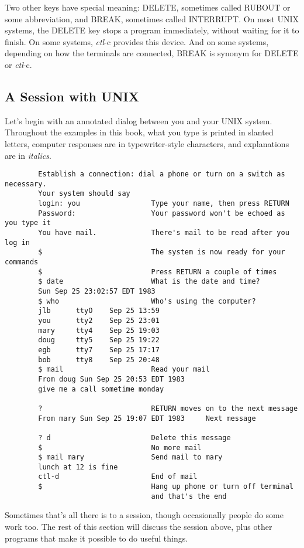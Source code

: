 Two other keys have special meaning: DELETE, sometimes called RUBOUT or some
abbreviation, and BREAK, sometimes called INTERRUPT. On most UNIX systems, the
DELETE key stops a program immediately, without waiting for it to finish. On
some systems, \textit{ctl}-c provides this device. And on some systems,
depending on how the terminals are connected, BREAK is synonym for DELETE or
\textit{ctl}-c.


\subsection{A Session with UNIX}

Let's begin with an annotated dialog between you and your UNIX system.
Throughout the examples in this book, what you type is printed in slanted
letters, computer responses are in typewriter-style characters, and explanations
are in \textit{italics}.

\begin{verbatim}
        Establish a connection: dial a phone or turn on a switch as necessary.
        Your system should say
        login: you                 Type your name, then press RETURN
        Password:                  Your password won't be echoed as you type it
        You have mail.             There's mail to be read after you log in
        $                          The system is now ready for your commands
        $                          Press RETURN a couple of times
        $ date                     What is the date and time?
        Sun Sep 25 23:02:57 EDT 1983
        $ who                      Who's using the computer?
        jlb      ttyO    Sep 25 13:59
        you      tty2    Sep 25 23:01
        mary     tty4    Sep 25 19:03
        doug     tty5    Sep 25 19:22
        egb      tty7    Sep 25 17:17
        bob      tty8    Sep 25 20:48
        $ mail                     Read your mail
        From doug Sun Sep 25 20:53 EDT 1983
        give me a call sometime monday

        ?                          RETURN moves on to the next message
        From mary Sun Sep 25 19:07 EDT 1983     Next message

        ? d                        Delete this message
        $                          No more mail
        $ mail mary                Send mail to mary
        lunch at 12 is fine
        ctl-d                      End of mail
        $                          Hang up phone or turn off terminal
                                   and that's the end
\end{verbatim}
Sometimes that's all there is to a session, though occasionally people do some
work too. The rest of this section will discuss the session above, plus other
programs that make it possible to do useful things.


